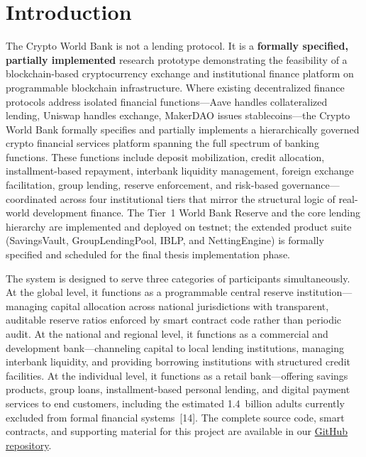 \documentclass[12pt,a4paper]{report}
\begin{document}
\chapter{Introduction}

The Crypto World Bank is not a lending protocol. It is a \textbf{formally specified, partially implemented} research prototype demonstrating the feasibility of a blockchain-based cryptocurrency exchange and institutional finance platform on programmable blockchain infrastructure. Where existing decentralized finance protocols address isolated financial functions---Aave handles collateralized lending, Uniswap handles exchange, MakerDAO issues stablecoins---the Crypto World Bank formally specifies and partially implements a hierarchically governed crypto financial services platform spanning the full spectrum of banking functions. These functions include deposit mobilization, credit allocation, installment-based repayment, interbank liquidity management, foreign exchange facilitation, group lending, reserve enforcement, and risk-based governance---coordinated across four institutional tiers that mirror the structural logic of real-world development finance. The Tier~1 World Bank Reserve and the core lending hierarchy are implemented and deployed on testnet; the extended product suite (SavingsVault, GroupLendingPool, IBLP, and NettingEngine) is formally specified and scheduled for the final thesis implementation phase.

The system is designed to serve three categories of participants simultaneously. At the global level, it functions as a programmable central reserve institution---managing capital allocation across national jurisdictions with transparent, auditable reserve ratios enforced by smart contract code rather than periodic audit. At the national and regional level, it functions as a commercial and development bank---channeling capital to local lending institutions, managing interbank liquidity, and providing borrowing institutions with structured credit facilities. At the individual level, it functions as a retail bank---offering savings products, group loans, installment-based personal lending, and digital payment services to end customers, including the estimated 1.4~billion adults currently excluded from formal financial systems~[14]. The complete source code, smart contracts, and supporting material for this project are available in our \href{https://github.com/Yuvraajrahman/Cryto-World-Bank}{GitHub repository}.
\end{document}
